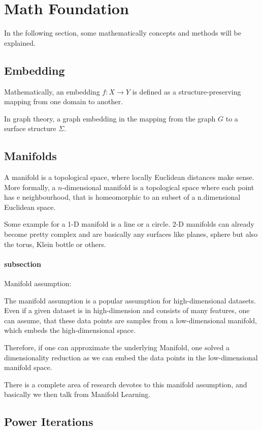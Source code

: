 \section{Math Foundation}
In the following section, some mathematically concepts and methods will be explained.

\subsection{Embedding}
Mathematically, an embedding $f: X \rightarrow Y$ is defined as a structure-preserving mapping from one domain to another.

In graph theory, a graph embedding in the mapping from the graph $G$
to a surface structure $\Sigma$. 


\subsection{Manifolds}
A manifold is a topological space, where locally Euclidean distances make sense.
More formally, a $n$-dimensional manifold is a topological space where
each point has e neighbourhood, that is homeomorphic to an subset of a n.dimensional
Euclidean space.

Some example for a 1-D manifold is a line or a circle. 2-D manifolds can already become 
pretty complex and are basically any surfaces like planes, sphere but also the torus,
Klein bottle or others.

\paragraph{subsection}{Manifold assumption:}
\label{sec:manifoldAssumption}

The manifold assumption is a popular assumption for high-dimensional datasets.
Even if a given dataset is in high-dimension and consists of many features, one can assume,
that these data points are samples from a low-dimensional manifold, 
which embeds the high-dimensional space.

Therefore, if one can approximate the underlying Manifold, one solved a dimensionality reduction
as we can embed the data points in the low-dimensional manifold space.

There is a complete area of research devotes to this manifold assumption, and basically
we then talk from Manifold Learning. 

\subsection{Power Iterations}
\label{sec:powerIterations}

